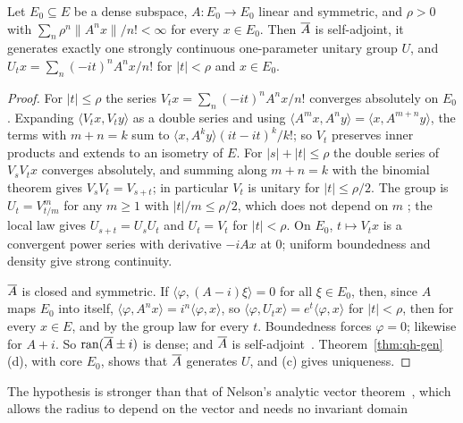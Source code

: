 \begin{vetqenv}
\begin{theorem}\label{thm:qh-analytic}
Let $E_0\subseteq E$ be a dense subspace, $A:E_0\to E_0$ linear and symmetric, and $\rho>0$ with
$\sum_n\rho^n\lVert A^nx\rVert/n!<\infty$ for every $x\in E_0$. Then $\overline{A}$ is self-adjoint, it generates exactly one strongly
continuous one-parameter unitary group $U$, and $U_tx=\sum_n(-it)^nA^nx/n!$ for $\lvert t\rvert<\rho$ and $x\in E_0$.
\end{theorem}

\begin{proof}
For $\lvert t\rvert\le\rho$ the series $V_tx=\sum_n(-it)^nA^nx/n!$ converges absolutely on $E_0$. Expanding
$\langle V_tx,V_ty\rangle$ as a double series and using $\langle A^mx,A^ny\rangle=\langle x,A^{m+n}y\rangle$, the terms with $m+n=k$ sum to
$\langle x,A^ky\rangle(it-it)^k/k!$; so $V_t$ preserves inner products and extends to an isometry of $E$. For
$\lvert s\rvert+\lvert t\rvert\le\rho$ the double series of $V_sV_tx$ converges absolutely, and summing along $m+n=k$ with the binomial
theorem gives $V_sV_t=V_{s+t}$; in particular $V_t$ is unitary for $\lvert t\rvert\le\rho/2$. The group is
$U_t=V_{t/m}^m$ for any $m\ge1$ with $\lvert t\rvert/m\le\rho/2$, which does not depend on $m$ ; the local law gives
$U_{s+t}=U_sU_t$ and $U_t=V_t$ for $\lvert t\rvert<\rho$. On $E_0$, $t\mapsto V_tx$ is a convergent power series with derivative
$-iAx$ at $0$; uniform boundedness and density give strong continuity.

$\overline{A}$ is closed and symmetric. If $\langle\varphi,(A-i)\xi\rangle=0$ for all $\xi\in E_0$, then, since $A$ maps $E_0$ into itself,
$\langle\varphi,A^nx\rangle=i^n\langle\varphi,x\rangle$, so $\langle\varphi,U_tx\rangle=e^t\langle\varphi,x\rangle$ for $\lvert t\rvert<\rho$, then for every $x\in E$, and by
the group law for every $t$. Boundedness forces $\varphi=0$; likewise for $A+i$. So $\operatorname{ran}(\overline{A}\pm i)$ is dense;  and $\overline{A}$ is
self-adjoint~\cite{rs1}. Theorem~\ref{thm:qh-gen}(d), with core $E_0$, shows that $\overline{A}$ generates $U$, and (c) gives uniqueness.
\end{proof}

The hypothesis is stronger than that of Nelson's analytic vector theorem~\cite[]{rs2}, which allows the
radius to depend on the vector and needs no invariant domain


\end{vetqenv}
